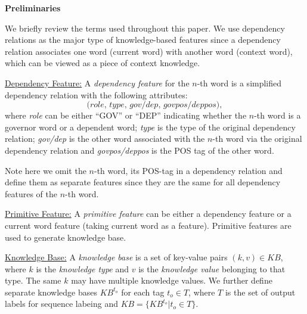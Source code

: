 \textbf{Preliminaries}

We briefly review the terms used throughout this paper. We use dependency relations as the major type of knowledge-based features since a dependency relation associates one word (current word) with another word (context word), which can be viewed as a piece of context knowledge.


\underline{Dependency Feature:} \label{chap6:defn:df} 
A \emph{dependency feature} for the $n$-th word is a simplified dependency relation with the following attributes:
$$\textit{(role, type, gov/dep, govpos/deppos)}, $$
where \emph{role} can be either ``GOV'' or ``DEP'' indicating whether the $n$-th word is a governor word or a dependent word; \emph{type} is the type of the original dependency relation; \emph{gov/dep} is the other word associated with the $n$-th word via the original dependency relation and \emph{govpos/deppos} is the POS tag of the other word.

Note here we omit the $n$-th word, its POS-tag in a dependency relation and define them as separate features since they are the same for all dependency features of the $n$-th word. 

\underline{Primitive Feature:} \label{chap6:defn:pf} 
A \emph{primitive feature} can be either a dependency feature or a current word feature (taking current word as a feature). Primitive features are used to generate knowledge base.

\underline{Knowledge Base:} \label{chap6:defn:kb} 
A \emph{knowledge base} is a set of key-value pairs $(k, v) \in \textit{KB}$, where $k$ is the \emph{knowledge type} and $v$ is the \emph{knowledge value} belonging to that type. The same $k$ may have multiple knowledge values. We further define separate knowledge bases $\textit{KB}^{t_o}$ for each tag $t_o \in T$, where $T$ is the set of output labels for sequence labeing and $\textit{KB}=\{\textit{KB}^{t_o}|t_o \in T\}$.

